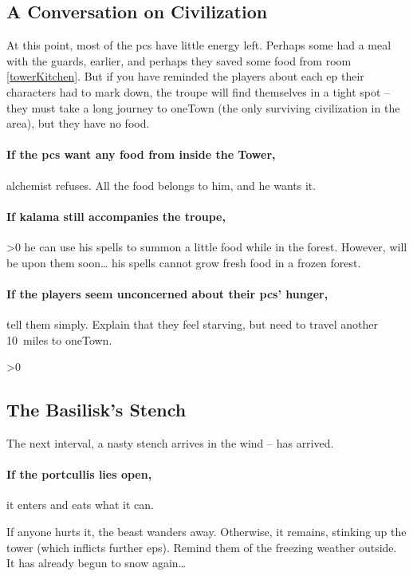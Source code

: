 \begin{multicols}{2}

\subsection{A Conversation on Civilization}

At this point, most of the \glspl{pc} have little energy left.
Perhaps some had a meal with the \glspl{guard}, earlier, and perhaps they saved some food from room \ref{towerKitchen}.
But if you have reminded the players about each \gls{ep} their characters had to mark down, the troupe will find themselves in a tight spot -- they must take a long journey to \gls{oneTown} (the only surviving civilization in the area), but they have no food.

\paragraph{If the \glspl{pc} want any food from inside the Tower,}
\gls{alchemist} refuses.
All the food belongs to him, and he wants it.

\paragraph{If \gls{kalama} still accompanies the troupe,}
\ifnum\value{temperature}>0
  he can use his spells to summon a little food while in the forest.
  However,  will be upon them soon\ldots
\else%
  his spells cannot grow fresh food in a frozen forest.
\fi

\paragraph{If the players seem unconcerned about their \glspl{pc}' hunger,}
tell them simply.
Explain that they feel starving, but need to travel another 10~miles to \gls{oneTown}.

\ifnum\value{temperature}>0%
  \subsection{The Basilisk's Stench}

  The next \gls{interval}, a nasty stench arrives in the wind --  has arrived.

  \paragraph{If the portcullis lies open,}
  it enters and eats what it can.

  If anyone hurts it, the beast wanders away.
  Otherwise, it remains, stinking up the tower (which inflicts further \glspl{ep}).
  \basilisk
\else
  Remind them of the freezing weather outside.
  It has already begun to snow again\ldots
\fi

\end{multicols}
